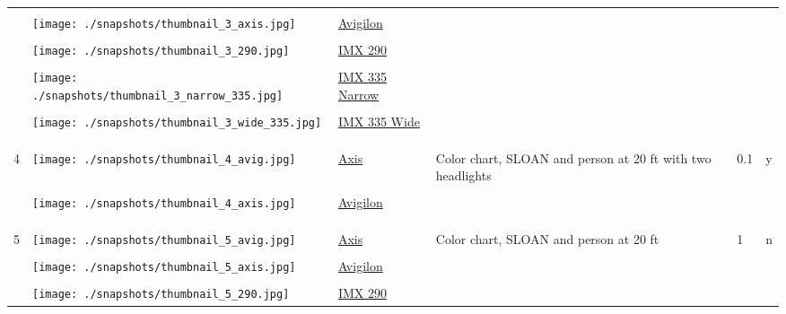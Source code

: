 \documentclass{article}%
\begin{document}
\begin{longtabu}{m{2.5cm} m{4cm} m{2cm} m{4cm} m{2cm} m{2cm}}
&&&&&\\%
&\texttt{[image: ./snapshots/thumbnail\_3\_axis.jpg]}&\href{https://drive.google.com/file/d/1Jv_5ABvKCxGoy3FBrwGth7CHPvijJzbC/view?usp=sharing}{Avigilon}&&&\\%
&&&&&\\%
&\texttt{[image: ./snapshots/thumbnail\_3\_290.jpg]}&\href{https://drive.google.com/file/d/12VL1gdjKlPqcwaDZMmox0JToHT8KDe5L/view?usp=sharing}{IMX 290}&&&\\%
&&&&&\\%
&\texttt{[image: ./snapshots/thumbnail\_3\_narrow\_335.jpg]}&\href{https://drive.google.com/file/d/1JtpyHYpi5WE-4bukV1eQRYKUVNGLHA9v/view?usp=sharing}{IMX 335 Narrow}&&&\\%
&&&&&\\%
&\texttt{[image: ./snapshots/thumbnail\_3\_wide\_335.jpg]}&\href{https://drive.google.com/file/d/1dWva5FP9_3fBOEda6hlaNBquHdUrAIYO/view?usp=sharing}{IMX 335 Wide}&&&\\%
&&&&&\\%
&&&&&\\%
\hline%
&&&&&\\%
4&\texttt{[image: ./snapshots/thumbnail\_4\_avig.jpg]}&\href{https://drive.google.com/file/d/1dzwAf_vjvnlZZigPS-tNTE3GUOtVdLHQ/view?usp=sharing}{Axis}&Color chart, SLOAN and person at 20 ft with two headlights&0.1&y\\%
&&&&&\\%
&\texttt{[image: ./snapshots/thumbnail\_4\_axis.jpg]}&\href{https://drive.google.com/file/d/1VykbA7uPZG0vlf5oge4vqfUiGAMm-ZEG/view?usp=sharing}{Avigilon}&&&\\%
&&&&&\\%
&&&&&\\%
\hline%
&&&&&\\%
5&\texttt{[image: ./snapshots/thumbnail\_5\_avig.jpg]}&\href{https://drive.google.com/file/d/1QjgfdstP6NkM28I8L67VvpeE0_j1vrTH/view?usp=sharing}{Axis}&Color chart, SLOAN and person at 20 ft&1&n\\%
&&&&&\\%
&\texttt{[image: ./snapshots/thumbnail\_5\_axis.jpg]}&\href{https://drive.google.com/file/d/1ZKxE8sKUDAM_w4QSf9a0iYzjH3_zque1/view?usp=sharing}{Avigilon}&&&\\%
&&&&&\\%
&\texttt{[image: ./snapshots/thumbnail\_5\_290.jpg]}&\href{https://drive.google.com/file/d/13uTJSzxMOpNTNiRlhc4r_q7YKX4gAzdr/view?usp=sharing}{IMX 290}&&&\\%

\end{longtabu}
\end{document}
